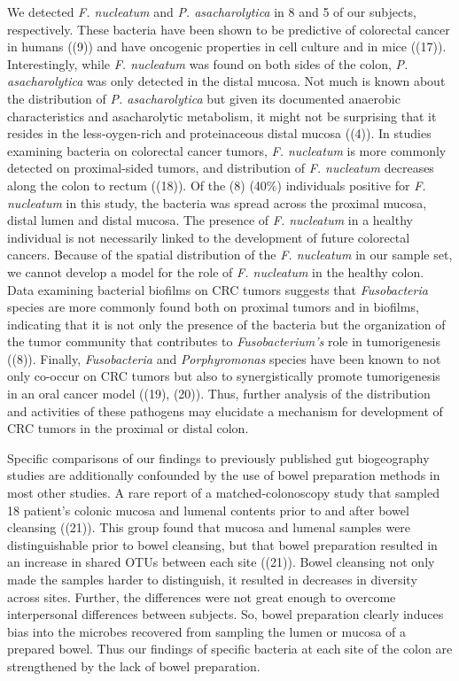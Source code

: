 \documentclass[11pt,]{article}
\begin{document}
We detected \emph{F. nucleatum} and \emph{P. asacharolytica} in 8 and 5
of our subjects, respectively. These bacteria have been shown to be
predictive of colorectal cancer in humans ((9)) and have oncogenic
properties in cell culture and in mice ((17)). Interestingly, while
\emph{F. nucleatum} was found on both sides of the colon, \emph{P.
asacharolytica} was only detected in the distal mucosa. Not much is
known about the distribution of \emph{P. asacharolytica} but given its
documented anaerobic characteristics and asacharolytic metabolism, it
might not be surprising that it resides in the less-oygen-rich and
proteinaceous distal mucosa ((4)). In studies examining bacteria on
colorectal cancer tumors, \emph{F. nucleatum} is more commonly detected
on proximal-sided tumors, and distribution of \emph{F. nucleatum}
decreases along the colon to rectum ((18)). Of the (8) (40\%)
individuals positive for \emph{F. nucleatum} in this study, the bacteria
was spread across the proximal mucosa, distal lumen and distal mucosa.
The presence of \emph{F. nucleatum} in a healthy individual is not
necessarily linked to the development of future colorectal cancers.
Because of the spatial distribution of the \emph{F. nucleatum} in our
sample set, we cannot develop a model for the role of \emph{F.
nucleatum} in the healthy colon. Data examining bacterial biofilms on
CRC tumors suggests that \emph{Fusobacteria} species are more commonly
found both on proximal tumors and in biofilms, indicating that it is not
only the presence of the bacteria but the organization of the tumor
community that contributes to \emph{Fusobacterium's} role in
tumorigenesis ((8)). Finally, \emph{Fusobacteria} and
\emph{Porphyromonas} species have been known to not only co-occur on CRC
tumors but also to synergistically promote tumorigenesis in an oral
cancer model ((19), (20)). Thus, further analysis of the distribution
and activities of these pathogens may elucidate a mechanism for
development of CRC tumors in the proximal or distal colon.

Specific comparisons of our findings to previously published gut
biogeography studies are additionally confounded by the use of bowel
preparation methods in most other studies. A rare report of a
matched-colonoscopy study that sampled 18 patient's colonic mucosa and
lumenal contents prior to and after bowel cleansing ((21)). This group
found that mucosa and lumenal samples were distinguishable prior to
bowel cleansing, but that bowel preparation resulted in an increase in
shared OTUs between each site ((21)). Bowel cleansing not only made the
samples harder to distinguish, it resulted in decreases in diversity
across sites. Further, the differences were not great enough to overcome
interpersonal differences between subjects. So, bowel preparation
clearly induces bias into the microbes recovered from sampling the lumen
or mucosa of a prepared bowel. Thus our findings of specific bacteria at
each site of the colon are strengthened by the lack of bowel
preparation.
\end{document}
